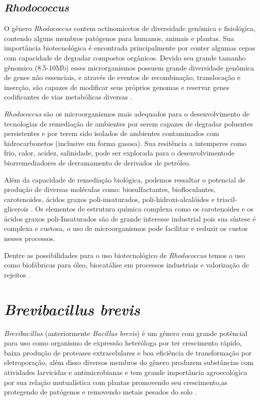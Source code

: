 \subsection{\textit{Rhodococcus}}
O gênero \textit{Rhodococcus} contem actinomicetos de diversidade genômica e fisiológica,
contendo alguns membros patógenos para humanos, animais e plantas. Sua importância biotecnológica
é encontrada principalmente por conter algumas cepas com capacidade de degradar compostos orgânicos.
Devido seu grande tamanho gênomico (8.5-10Mb) esses microrganismos possuem grande diversidade genômica
de genes não essenciais, e através de eventos de recombinação, translocação e inserção, são capazes
de modificar seus próprios genomas e reservar genes codificantes de vias metabólicas diversas \cite{cappelletti2019}.

\textit{Rhodococcus} são os microorganismos mais adequados para o desenvolvimento de
tecnologias de remediação de ambientes por serem capazes de degradar poluentes persistentes e por
terem sido isolados de ambientes contaminados com hidrocarbonetos 
(inclusive em forma gasosa)\cite{kuyukina2019}. Sua resitência a intemperes como frio, calor, acidez,
salinidade, pode ser explorada para o desenvolvimentode biorremediadores de derramamento de derivados
de petróleo.

Além da capacidade de remediação biológica, podemos ressaltar o potencial de produção de diversas moléculas
como: biosulfactantes, biofloculantes, carotenoides, ácidos graxos poli-insaturados, poli-hidroxi-alcalóides e
triacil-glicerois \cite{cappelletti2020}. Os elementos de estrutura química complexa como os
carotenoides e os ácidos graxos poli-Insaturados são de grande interesse industrial pois sua síntese 
é complexa e custosa, o uso de microorganismos pode facilitar e reduzir os custos nesses processos.

Dentre as possibilidades para o uso biotecnológico de \textit{Rhodococcus} temos o uso como biofábricas 
para óleo, biocatálise em processos industriais e valorização de rejeitos \cite{alvarez2021,krivoruchko2019,anthony2019,chatterjee2020}.

\section{\textit{Brevibacillus brevis}}
\textit{Brevibacillus} (anteriormente \textit{Bacillus brevis}) é um gênero com grande potêncial para uso como organismo de expressão heteróloga
por ter crescimento rápido, baixa produção de proteases extracelulares e boa eficiência de transformação
por eletroporação, além disso diversos membros do gênero produzem substâncias com atividades 
larvicidas e antimicrobianas e tem grande importância agroecológica por sua relação mutualística
com plantas promovendo seu crescimento,as protegendo de patógenos e removendo metais pesados do solo
\cite{panda2014brevibacillus,ray2020brevibacillus}.  


